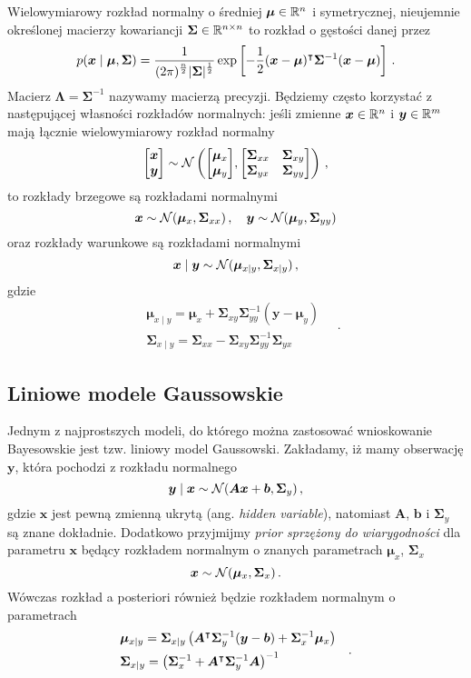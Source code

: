 \documentclass{myclass}
\begin{document}
Wielowymiarowy rozkład normalny o średniej \(\bm{\mu} \in \mathbb{R}^n\) i symetrycznej, nieujemnie
określonej macierzy kowariancji \(\bm{\Sigma} \in \mathbb{R}^{n \times n}\) to rozkład o gęstości danej
przez
\[
    p(\bm{x} \mid \bm{\mu}, \bm{\Sigma}) = \frac{1}{\displaystyle (2\pi)^\frac{n}{2} |\bm{\Sigma}|^\frac{1}{2}} \exp \left[-\frac{1}{2} (\bm{x} - \bm{\mu})^\intercal \bm{\Sigma}^{-1} (\bm{x} - \bm{\mu})\right]\,.
\]
Macierz \(\bm{\Lambda} = \bm{\Sigma}^{-1}\) nazywamy macierzą precyzji. Będziemy często korzystać z
następującej własności rozkładów normalnych: jeśli zmienne \(\bm{x} \in \mathbb{R}^n\) i \(\bm{y} \in
\mathbb{R}^m\) mają łącznie wielowymiarowy rozkład normalny
\[
    \mqty[\bm{x} \\ \bm{y}] \sim \mc{N}\left(\mqty[\bm{\mu}_x \\ \bm{\mu}_y], \mqty[\bm{\Sigma}_{xx} & \bm{\Sigma}_{xy} \\ \bm{\Sigma}_{yx} & \bm{\Sigma}_{yy}]\right)\,,
\]
to rozkłady brzegowe są rozkładami normalnymi
\[
    \bm{x} \sim \mathcal{N}(\bm{\mu}_x, \bm{\Sigma}_{xx})\,,\quad \bm{y} \sim \mathcal{N}(\bm{\mu}_y, \bm{\Sigma}_{yy})
\]
oraz rozkłady warunkowe są rozkładami normalnymi
\[
    \bm{x} \mid \bm{y} \sim \mathcal{N}(\bm{\mu}_{x\mid y}, \bm{\Sigma}_{x \mid y})\,,
\]
gdzie
\[
\begin{split}
    &\bm{\mu}_{x \mid y} = \bm{\mu}_x + \bm{\Sigma}_{xy} \bm{\Sigma}_{yy}^{-1} (\bm{y} - \bm{\mu}_y) \\
    &\bm{\Sigma}_{x \mid y} = \bm{\Sigma}_{xx} - \bm{\Sigma}_{xy} \bm{\Sigma}_{yy}^{-1} \bm{\Sigma}_{yx}
\end{split}\quad.
\]


\subsection{Liniowe modele Gaussowskie}

Jednym z najprostszych modeli, do którego można zastosować wnioskowanie Bayesowskie jest tzw.
liniowy model Gaussowski. Zakładamy, iż mamy obserwację \(\bm{y}\), która pochodzi z rozkładu
normalnego
\[
    \bm{y} \mid \bm{x} \sim \mathcal{N}(\bm{A}\bm{x} + \bm{b}, \bm{\Sigma}_y)\,,
\]
gdzie \(\bm{x}\) jest pewną zmienną ukrytą (ang. \emph{hidden variable}), natomiast \(\bm{A}\),
\(\bm{b}\) i \(\bm{\Sigma}_y\) są znane dokładnie. Dodatkowo przyjmijmy \emph{prior sprzężony do
wiarygodności} dla parametru \(\bm{x}\) będący rozkładem normalnym o znanych parametrach
\(\bm{\mu}_x\), \(\bm{\Sigma}_x\)
\[
    \bm{x} \sim \mathcal{N}(\bm{\mu}_x, \bm{\Sigma}_x) \,.
\]
Wówczas rozkład a posteriori również będzie rozkładem normalnym o parametrach
\[
\begin{split}
    &\bm{\mu}_{x \mid y} = \bm{\Sigma}_{x \mid y} \left( \bm{A}^\intercal \bm{\Sigma}_y^{-1}(\bm{y} - \bm{b}) + \bm{\Sigma}_x^{-1} \bm{\mu}_x \right)\\
    &\bm{\Sigma}_{x \mid y} = \left(\bm{\Sigma}_x^{-1} + \bm{A}^\intercal \bm{\Sigma}_y^{-1} \bm{A} \right)^{-1}
\end{split}\quad.
\]
\end{document}
